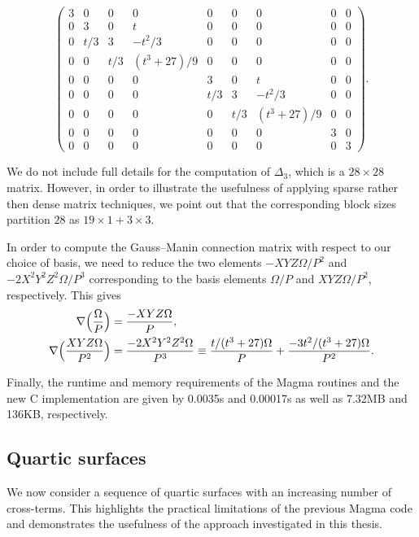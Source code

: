 \begin{equation*}
\renewcommand{\arraystretch}{0.68}
\begin{pmatrix}
3 & 0 & 0 & 0 & 0 & 0 & 0 & 0 & 0 \\
0 & 3 & 0 & t & 0 & 0 & 0 & 0 & 0 \\
0 & t/3 & 3 & -t^2/3 & 0 & 0 & 0 & 0 & 0 \\
0 & 0 & t/3 & (t^3+27)/9 & 0 & 0 & 0 & 0 & 0 \\
0 & 0 & 0 & 0 & 3 & 0 & t & 0 & 0 \\
0 & 0 & 0 & 0 & t/3 & 3 & -t^2/3 & 0 & 0 \\
0 & 0 & 0 & 0 & 0 & t/3 & (t^3+27)/9 & 0 & 0 \\
0 & 0 & 0 & 0 & 0 & 0 & 0 & 3 & 0 \\
0 & 0 & 0 & 0 & 0 & 0 & 0 & 0 & 3
\end{pmatrix}.
\end{equation*}

We do not include full details for the computation of $\Delta_3$, which is a 
$28 \times 28$ matrix.  However, in order to illustrate the usefulness of 
applying sparse rather then dense matrix techniques, we point out that the 
corresponding block sizes partition $28$ as $19 \times 1 + 3 \times 3$.

In order to compute the Gauss--Manin connection matrix with respect to our 
choice of basis, we need to reduce the two elements $- XYZ \Omega / P^2$ and 
$-2 X^2 Y^2 Z^2 \Omega / P^3$ corresponding to the basis elements $\Omega / P$ 
and $XYZ \Omega / P^2$, respectively.  This gives 
\begin{align*}
\nabla \Bigl( \frac{\Omega}{P} \Bigr) & = \frac{- XYZ \Omega}{P}, \\
\nabla \Bigl( \frac{XYZ \Omega}{P^2} \Bigr) & = \frac{-2 X^2 Y^2 Z^2 \Omega}{P^3} \equiv \frac{t/(t^3+27) \Omega}{P} + \frac{-3t^2/(t^3+27) \Omega}{P^2}.
\end{align*}

Finally, the runtime and memory requirements of the {\sc Magma} routines 
and the new C implementation are given by 0.0035s and 0.00017s as well as 
7.32MB and 136KB, respectively.

\subsection{Quartic surfaces}

We now consider a sequence of quartic surfaces with an increasing number of 
cross-terms.  This highlights the practical limitations of the previous 
{\sc Magma} code and demonstrates the usefulness of the approach investigated 
in this thesis.


